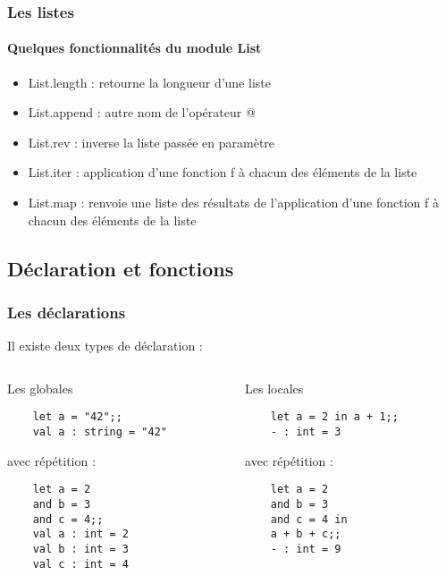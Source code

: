 \begin{frame}[fragile]
	\frametitle{Les listes}
	\framesubtitle{Quelques fonctionnalités du module List}
	\begin{itemize}
	
	\item List.length : retourne la longueur d'une liste
	
	\item List.append : autre nom de l'opérateur @
	
	\item List.rev : inverse la liste passée en paramètre
	
	\item List.iter : application d'une fonction f à chacun des éléments de la liste

	\item List.map : renvoie une liste des résultats de l'application d'une fonction f à chacun des éléments de la liste

	\end{itemize}
\end{frame}


\subsection{Déclaration et fonctions} %
\begin{frame}[fragile]
      \frametitle{Les déclarations}
      Il existe deux types de déclaration :
	\begin{columns}[t]
		\begin{column}{5cm}
		\begin{block}{Les globales}
		\begin{lstlisting}
	let a = "42";;
	val a : string = "42"
	\end{lstlisting}
	avec répétition :
	\begin{lstlisting}
	let a = 2
	and b = 3
	and c = 4;;
	val a : int = 2
	val b : int = 3
	val c : int = 4
		\end{lstlisting}
		\end{block}
		\end{column}
      		\begin{column}{5cm}
		\begin{block}{Les locales}
		\begin{lstlisting}
	let a = 2 in a + 1;;
	- : int = 3
	\end{lstlisting}
	avec répétition :
	\begin{lstlisting}
	let a = 2
	and b = 3
	and c = 4 in
	a + b + c;;
	- : int = 9
		\end{lstlisting}
		\end{block}
      		\end{column}
	\end{columns}
\end{frame}


